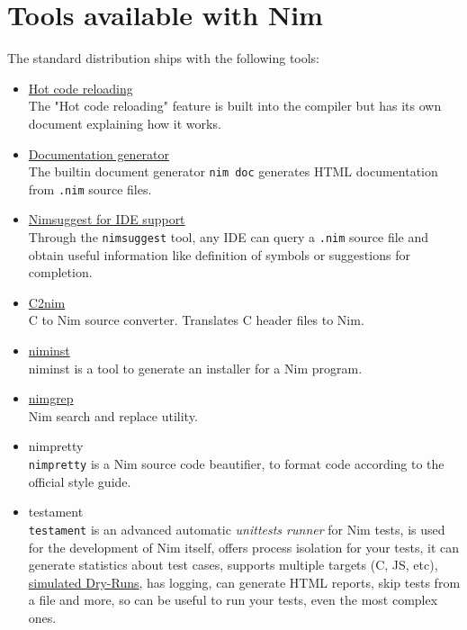 \hypertarget{tools-available-with-nim}{%
\section{Tools available with Nim}\label{tools-available-with-nim}}

The standard distribution ships with the following tools:

\begin{itemize}
\item
  \href{hcr.html}{Hot code reloading}\\
  The "Hot code reloading" feature is built into the compiler but has
  its own document explaining how it works.
\item
  \href{docgen.html}{Documentation generator}\\
  The builtin document generator \texttt{nim\ doc} generates HTML
  documentation from \texttt{.nim} source files.
\item
  \href{nimsuggest.html}{Nimsuggest for IDE support}\\
  Through the \texttt{nimsuggest} tool, any IDE can query a
  \texttt{.nim} source file and obtain useful information like
  definition of symbols or suggestions for completion.
\item
  \href{https://github.com/nim-lang/c2nim/blob/master/doc/c2nim.rst}{C2nim}\\
  C to Nim source converter. Translates C header files to Nim.
\item
  \href{niminst.html}{niminst}\\
  niminst is a tool to generate an installer for a Nim program.
\item
  \href{nimgrep.html}{nimgrep}\\
  Nim search and replace utility.
\item
  nimpretty\\
  \texttt{nimpretty} is a Nim source code beautifier, to format code
  according to the official style guide.
\item
  testament\\
  \texttt{testament} is an advanced automatic \emph{unittests runner}
  for Nim tests, is used for the development of Nim itself, offers
  process isolation for your tests, it can generate statistics about
  test cases, supports multiple targets (C, JS, etc),
  \href{https://en.wikipedia.org/wiki/Dry_run_(testing)}{simulated
  Dry-Runs}, has logging, can generate HTML reports, skip tests from a
  file and more, so can be useful to run your tests, even the most
  complex ones.
\end{itemize}

